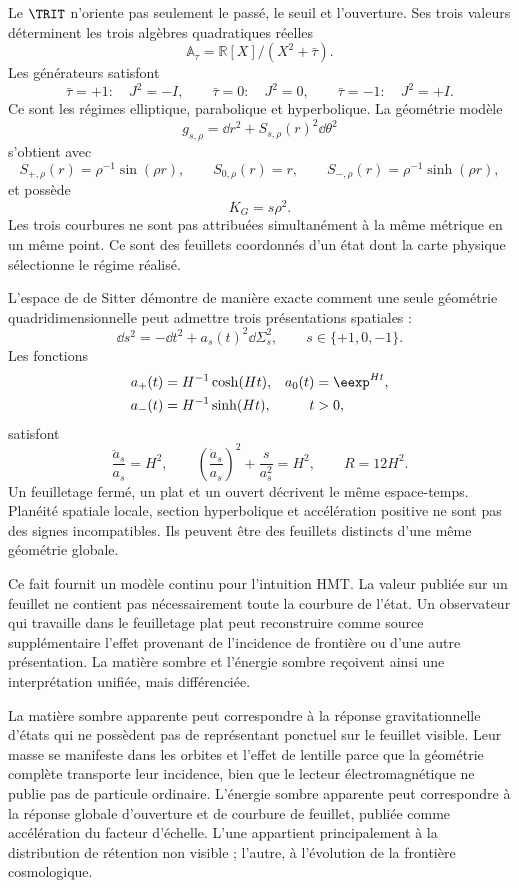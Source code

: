 Le \(\TRIT\) n'oriente pas seulement le passé, le seuil et l'ouverture. Ses trois valeurs déterminent
les trois algèbres quadratiques réelles
\[
 \mathbb A_\tau
 =
 \mathbb R[X]/(X^2+\bar\tau).
\]
Les générateurs satisfont
\[
 \bar\tau=+1:
 \quad J^2=-I,
 \qquad
 \bar\tau=0:
 \quad J^2=0,
 \qquad
 \bar\tau=-1:
 \quad J^2=+I.
\]
Ce sont les régimes elliptique, parabolique et hyperbolique. La géométrie modèle
\[
 g_{s,\rho}
 =
 \dd r^2+S_{s,\rho}(r)^2\dd\theta^2
\]
s'obtient avec
\[
 S_{+,\rho}(r)=\rho^{-1}\sin(\rho r),
 \qquad
 S_{0,\rho}(r)=r,
 \qquad
 S_{-,\rho}(r)=\rho^{-1}\sinh(\rho r),
\]
et possède
\[
 K_G=s\rho^2.
\]
Les trois courbures ne sont pas attribuées simultanément à la même métrique en un même
point. Ce sont des feuillets coordonnés d'un état dont la carte physique sélectionne le régime
réalisé.

L'espace de de Sitter démontre de manière exacte comment une seule géométrie
quadridimensionnelle peut admettre trois présentations spatiales :
\[
 \dd s^2
 =
 -\dd t^2+a_s(t)^2\dd\Sigma_s^2,
 \qquad s\in\{+1,0,-1\}.
\]
Les fonctions
\[
 \begin{aligned}
 a_+(t)&=H^{-1}\cosh(Ht),
 &
 a_0(t)&=\eexp^{Ht},\\
 a_-(t)&=H^{-1}\sinh(Ht),
 &
 t&>0,
 \end{aligned}
\]
satisfont
\[
 \frac{\ddot a_s}{a_s}=H^2,
\qquad
 \left(\frac{\dot a_s}{a_s}\right)^2
 +
 \frac{s}{a_s^2}
 =
 H^2,
\qquad
 R=12H^2.
\]
Un feuilletage fermé, un plat et un ouvert décrivent le même espace-temps.
Planéité spatiale locale, section hyperbolique et accélération positive ne sont pas des signes
incompatibles. Ils peuvent être des feuillets distincts d'une même géométrie globale.

Ce fait fournit un modèle continu pour l'intuition HMT. La valeur publiée
sur un feuillet ne contient pas nécessairement toute la courbure de l'état. Un observateur
qui travaille dans le feuilletage plat peut reconstruire comme source supplémentaire l'effet
provenant de l'incidence de frontière ou d'une autre présentation. La matière sombre et
l'énergie sombre reçoivent ainsi une interprétation unifiée, mais différenciée.

La matière sombre apparente peut correspondre à la réponse gravitationnelle d'états
qui ne possèdent pas de représentant ponctuel sur le feuillet visible. Leur masse se manifeste dans les
orbites et l'effet de lentille parce que la géométrie complète transporte leur incidence, bien que le
lecteur électromagnétique ne publie pas de particule ordinaire. L'énergie sombre
apparente peut correspondre à la réponse globale d'ouverture et de courbure de feuillet,
publiée comme accélération du facteur d'échelle. L'une appartient principalement à la
distribution de rétention non visible ; l'autre, à l'évolution de la frontière
cosmologique.

